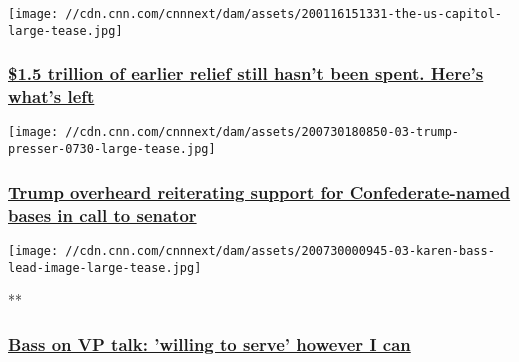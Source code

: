 \href{/2020/07/31/politics/stimulus-relief-money/index.html}{}

\texttt{[image: //cdn.cnn.com/cnnnext/dam/assets/200116151331-the-us-capitol-large-tease.jpg]}

\hypertarget{15-trillion-of-earlier-relief-still-hasnt-been-spent-heres-whats-left}{%
\subsubsection{\texorpdfstring{\href{/2020/07/31/politics/stimulus-relief-money/index.html}{\$1.5
trillion of earlier relief still hasn't been spent. Here's what's
left}}{\$1.5 trillion of earlier relief still hasn't been spent. Here's what's left}}\label{15-trillion-of-earlier-relief-still-hasnt-been-spent-heres-whats-left}}

\href{/2020/07/31/politics/trump-confederate-bases-inhofe-call/index.html}{}

\texttt{[image: //cdn.cnn.com/cnnnext/dam/assets/200730180850-03-trump-presser-0730-large-tease.jpg]}

\hypertarget{trump-overheard-reiterating-support-for-confederate-named-bases-in-call-to-senator}{%
\subsubsection{\texorpdfstring{\href{/2020/07/31/politics/trump-confederate-bases-inhofe-call/index.html}{Trump
overheard reiterating support for Confederate-named bases in call to
senator}}{Trump overheard reiterating support for Confederate-named bases in call to senator}}\label{trump-overheard-reiterating-support-for-confederate-named-bases-in-call-to-senator}}

\href{/videos/politics/2020/07/26/sotu-bass-willing-to-serve.cnn}{}

\texttt{[image: //cdn.cnn.com/cnnnext/dam/assets/200730000945-03-karen-bass-lead-image-large-tease.jpg]}

**

\hypertarget{bass-on-vp-talk-willing-to-serve-however-i-can}{%
\subsubsection{\texorpdfstring{\href{/videos/politics/2020/07/26/sotu-bass-willing-to-serve.cnn}{Bass
on VP talk: 'willing to serve' however I
can}}{Bass on VP talk: 'willing to serve' however I can}}\label{bass-on-vp-talk-willing-to-serve-however-i-can}}

